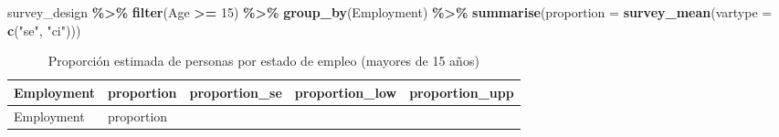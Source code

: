 \documentclass[
  spanish,
  12pt,
]{book}
\newenvironment{Shaded}{\begin{snugshade}}{\end{snugshade}}
\newcommand{\AttributeTok}[1]{\textcolor[rgb]{0.13,0.29,0.53}{#1}}
\newcommand{\DecValTok}[1]{\textcolor[rgb]{0.00,0.00,0.81}{#1}}
\newcommand{\FunctionTok}[1]{\textcolor[rgb]{0.13,0.29,0.53}{\textbf{#1}}}
\newcommand{\NormalTok}[1]{#1}
\newcommand{\SpecialCharTok}[1]{\textcolor[rgb]{0.81,0.36,0.00}{\textbf{#1}}}
\newcommand{\StringTok}[1]{\textcolor[rgb]{0.31,0.60,0.02}{#1}}
\begin{document}
\begin{Shaded}
\begin{Highlighting}[]
\NormalTok{survey\_design }\SpecialCharTok{\%\textgreater{}\%}
  \FunctionTok{filter}\NormalTok{(Age }\SpecialCharTok{\textgreater{}=} \DecValTok{15}\NormalTok{) }\SpecialCharTok{\%\textgreater{}\%}
  \FunctionTok{group\_by}\NormalTok{(Employment) }\SpecialCharTok{\%\textgreater{}\%}
  \FunctionTok{summarise}\NormalTok{(}\AttributeTok{proportion =} \FunctionTok{survey\_mean}\NormalTok{(}\AttributeTok{vartype =} \FunctionTok{c}\NormalTok{(}\StringTok{"se"}\NormalTok{, }\StringTok{"ci"}\NormalTok{)))}
\end{Highlighting}
\end{Shaded}

\begin{longtable}[]{@{}
  >{\raggedright\arraybackslash}p{}
  >{\centering\arraybackslash}p{}
  >{\centering\arraybackslash}p{}
  >{\centering\arraybackslash}p{}
  >{\centering\arraybackslash}p{}@{}}
\caption{\label{tab:tab-prop-empleo-15}Proporción estimada de personas por estado de empleo (mayores de 15 años)}\tabularnewline
\toprule\noalign{}
\begin{minipage}[b]{\linewidth}\raggedright
Employment
\end{minipage} & \begin{minipage}[b]{\linewidth}\centering
proportion
\end{minipage} & \begin{minipage}[b]{\linewidth}\centering
proportion\_se
\end{minipage} & \begin{minipage}[b]{\linewidth}\centering
proportion\_low
\end{minipage} & \begin{minipage}[b]{\linewidth}\centering
proportion\_upp
\end{minipage} \\
\midrule\noalign{}
\endfirsthead
\toprule\noalign{}
\begin{minipage}[b]{\linewidth}\raggedright
Employment
\end{minipage} & \begin{minipage}[b]{\linewidth}\centering
proportion
\end{minipage} & \begin{minipage}[b]{\linewidth}\centering

\end{minipage}
\end{longtable}
\end{document}
